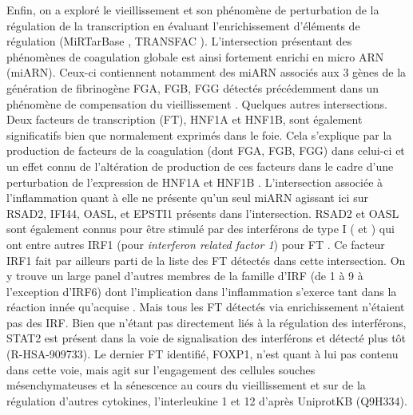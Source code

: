 Enfin, on a exploré le vieillissement et son phénomène de perturbation de la régulation de la transcription en évaluant l'enrichissement d'éléments de régulation (MiRTarBase , TRANSFAC ). L'intersection présentant des phénomènes de coagulation globale est ainsi fortement enrichi en micro ARN (miARN). Ceux-ci contiennent notamment des miARN associés aux 3 gènes de la génération de fibrinogène FGA, FGB, FGG détectés précédemment dans un phénomène de compensation du vieillissement . Quelques autres intersections. Deux facteurs de transcription (FT), HNF1A et HNF1B, sont également significatifs bien que normalement exprimés dans le foie. Cela s'explique par la production de facteurs de la coagulation (dont FGA, FGB, FGG) dans celui-ci et un effet connu de l'altération de production de ces facteurs dans le cadre d'une perturbation de l'expression de HNF1A et HNF1B . L'intersection associée à l'inflammation quant à elle ne présente qu'un seul miARN agissant ici sur RSAD2, IFI44, OASL, et EPSTI1 présents dans l'intersection. RSAD2 et OASL sont également connus pour être stimulé par des interférons de type I (\textalpha{} et \textbeta{}) qui ont entre autres IRF1 (pour \textit{interferon related factor 1}) pour FT . Ce facteur IRF1 fait par ailleurs parti de la liste des FT détectés dans cette intersection. On y trouve un large panel d'autres membres de la famille d'IRF (de 1 à 9 à l'exception d'IRF6) dont l'implication dans l'inflammation s'exerce tant dans la réaction innée qu’acquise . Mais tous les FT détectés via enrichissement n'étaient pas des IRF. Bien que n'étant pas directement liés à la régulation des interférons, STAT2 est présent dans la voie de signalisation des interférons \textalpha{} et \textbeta{} détecté plus tôt (R-HSA-909733). Le dernier FT identifié, FOXP1, n'est quant à lui pas contenu dans cette voie, mais agit sur l'engagement des cellules souches mésenchymateuses et la sénescence au cours du vieillissement  et sur de la régulation d'autres cytokines, l'interleukine 1 et 12 d'après UniprotKB (Q9H334).

